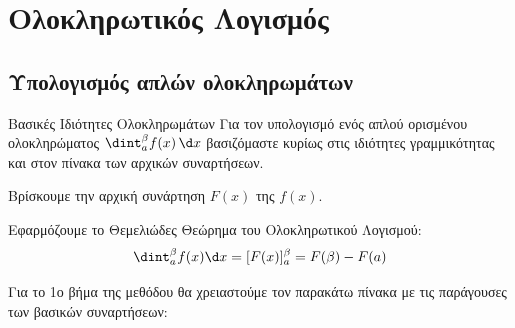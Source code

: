 \section{Ολοκληρωτικός Λογισμός}

\subsection{Υπολογισμός απλών ολοκληρωμάτων}
\begin{askhsh}{Βασικές Ιδιότητες Ολοκληρωμάτων}
Για τον υπολογισμό ενός απλού ορισμένου ολοκληρώματος $\dint_a^{\beta}{f(x)\, \d x}$ βασιζόμαστε κυρίως στις ιδιότητες γραμμικότητας και στον πίνακα των αρχικών συναρτήσεων.

\bhmata
\begin{bhma}
    \item Βρίσκουμε την αρχική συνάρτηση $F(x)$ της $f(x)$.
    \item Εφαρμόζουμε το Θεμελιώδες Θεώρημα του Ολοκληρωτικού Λογισμού: \[\dint_a^\beta f(x)\d x = [F(x)]_a^\beta = F(\beta) - F(a)\]
\end{bhma}
\end{askhsh}
Για το 1ο βήμα της μεθόδου θα χρειαστούμε τον παρακάτω πίνακα με τις παράγουσες των βασικών συναρτήσεων:
